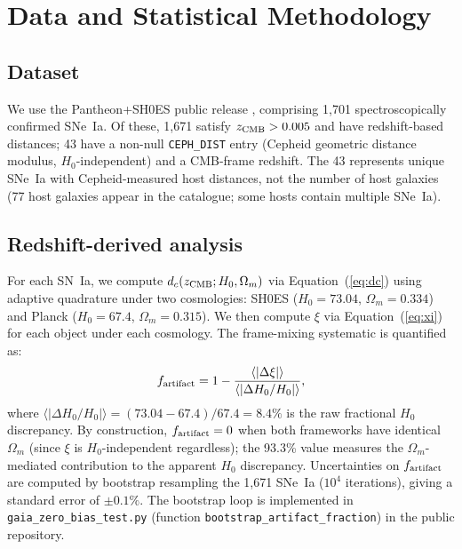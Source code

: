 \documentclass[usenatbib]{mnras}
\begin{document}
\section{Data and Statistical Methodology}
\label{sec:method}

\subsection{Dataset}

We use the Pantheon+SH0ES public release \citep{brout2022}, comprising
1,701 spectroscopically confirmed SNe~Ia. Of these, 1,671 satisfy
$z_{\rm CMB} > 0.005$ and have redshift-based distances; 43 have a
non-null \texttt{CEPH\_DIST} entry (Cepheid geometric distance modulus,
$H_0$-independent) and a CMB-frame redshift. The 43 represents unique
SNe~Ia with Cepheid-measured host distances, not the number of host
galaxies (77 host galaxies appear in the catalogue; some hosts contain
multiple SNe~Ia).

\subsection{Redshift-derived analysis}

For each SN~Ia, we compute $d_c(z_{\rm CMB}; H_0, \Omega_m)$ via
Equation~(\ref{eq:dc}) using adaptive quadrature under two cosmologies:
SH0ES ($H_0 = 73.04$, $\Omega_m = 0.334$) and Planck
($H_0 = 67.4$, $\Omega_m = 0.315$). We then compute $\xi$ via
Equation~(\ref{eq:xi}) for each object under each cosmology. The
frame-mixing systematic is quantified as:
\begin{equation}
f_{\rm artifact} = 1 - \frac{\langle|\Delta\xi|\rangle}{\langle|\Delta H_0/H_0|\rangle},
\label{eq:fartifact}
\end{equation}
where $\langle|\Delta H_0/H_0|\rangle = (73.04 - 67.4)/67.4 = 8.4\%$ is the
raw fractional $H_0$ discrepancy. By construction, $f_{\rm artifact} = 0$
when both frameworks have identical $\Omega_m$ (since $\xi$ is
$H_0$-independent regardless); the 93.3\% value measures the
$\Omega_m$-mediated contribution to the apparent $H_0$ discrepancy.
Uncertainties on $f_{\rm artifact}$ are computed by bootstrap resampling
the 1,671 SNe~Ia ($10^4$ iterations), giving a standard error of $\pm0.1\%$. The bootstrap loop is implemented
in \texttt{gaia\_zero\_bias\_test.py} (function \texttt{bootstrap\_artifact\_fraction})
in the public repository.
\end{document}
